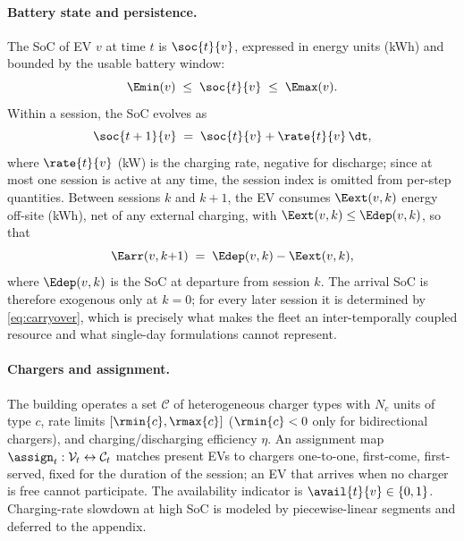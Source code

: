 \paragraph{Battery state and persistence.} The SoC of EV $v$ at time $t$
is $\soc{t}{v}$, expressed in energy units (kWh) and bounded by the
usable battery window:
\begin{equation}\label{eq:socbounds}
\Emin(v) \;\le\; \soc{t}{v} \;\le\; \Emax(v).
\end{equation}
Within a session, the SoC evolves as
\begin{equation}\label{eq:soc}
\soc{t+1}{v} \;=\; \soc{t}{v} + \rate{t}{v}\,\dt,
\end{equation}
where $\rate{t}{v}$ (kW) is the charging rate, negative for discharge;
since at most one session is active at any time, the session index is
omitted from per-step quantities. Between sessions $k$ and $k{+}1$, the
EV consumes $\Eext(v,k)$ energy off-site (kWh), net of any external
charging, with $\Eext(v,k) \le \Edep(v,k)$, so that
\begin{equation}\label{eq:carryover}
\Earr(v,k{+}1) \;=\; \Edep(v,k) - \Eext(v,k),
\end{equation}
where $\Edep(v,k)$ is the SoC at departure from session $k$. The arrival
SoC is therefore exogenous only at $k = 0$; for every later session it is
determined by \eqref{eq:carryover}, which is precisely what makes the
fleet an inter-temporally coupled resource and what single-day
formulations cannot represent.

\paragraph{Chargers and assignment.} The building operates a set
$\mathcal{C}$ of heterogeneous charger types with $N_c$ units of type
$c$, rate limits $[\rmin{c}, \rmax{c}]$ ($\rmin{c} < 0$ only for
bidirectional chargers), and charging/discharging efficiency $\eta$. An
assignment map $\assign_t : \mathcal{V}_t \leftrightarrow \mathcal{C}_t$
matches present EVs to chargers one-to-one, first-come, first-served,
fixed for the duration of the session; an EV that arrives when no charger
is free cannot participate. The availability indicator is $\avail{t}{v}
\in \{0,1\}$. Charging-rate slowdown at high SoC is modeled by
piecewise-linear segments and deferred to the appendix.

